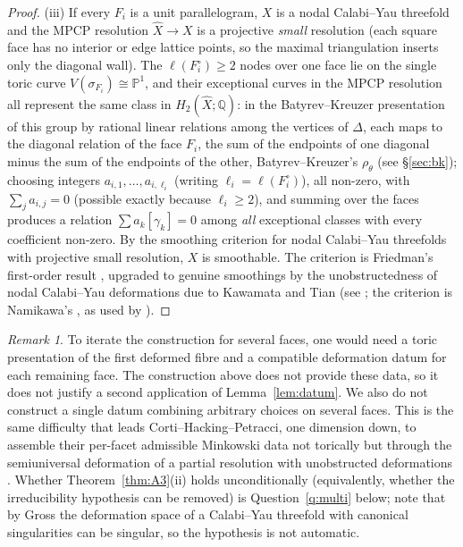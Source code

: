 \documentclass[11pt]{amsart}
\theoremstyle{definition}
\theoremstyle{remark}
\newtheorem{remark}[theorem]{Remark}
\newcommand{\PP}{\mathbb{P}}
\begin{document}
\begin{proof}
(iii)  If every $F_i$ is a unit parallelogram, $X$ is a nodal
Calabi--Yau threefold and the MPCP resolution $\widehat X \to X$ is a
projective \emph{small} resolution (each square face has no interior or
edge lattice points, so the maximal triangulation inserts only the
diagonal wall).  The $\ell(F_i^\circ) \ge 2$ nodes over one face lie on
the single toric curve $V(\sigma_{F_i}) \cong \PP^1$, and their
exceptional curves in the MPCP resolution all represent the same class
in $H_2(\widehat X;\mathbb{Q})$: in the Batyrev--Kreuzer presentation of
this group by rational linear relations among the vertices of $\Delta$,
each maps to the diagonal relation of the face $F_i$, the sum of the
endpoints of one diagonal minus the sum of the endpoints of the other,
Batyrev--Kreuzer's $\rho_\theta$ \cite{BK10} (see \S\ref{sec:bk}); choosing integers $a_{i,1},\dots,a_{i,\ell_i}$
(writing $\ell_i = \ell(F_i^\circ)$), all
non-zero, with $\sum_j a_{i,j} = 0$ (possible exactly because
$\ell_i \ge 2$), and summing over the faces produces a relation
$\sum a_k [\gamma_k] = 0$ among \emph{all} exceptional classes with every
coefficient non-zero.  By the smoothing criterion for nodal
Calabi--Yau threefolds with projective small resolution, $X$ is
smoothable.  The criterion is Friedman's first-order result
\cite{Friedman86}, upgraded to genuine
smoothings by the unobstructedness of nodal Calabi--Yau deformations
due to Kawamata and Tian (see \cite{RollenskeThomas}; the criterion is
Namikawa's \cite{Namikawa02}, as used by \cite{BK10}).
\end{proof}

\begin{remark}\label{rem:noiterate}
To iterate the construction for several faces, one would need a toric
presentation of the first deformed fibre and a compatible deformation
datum for each remaining face.  The construction above does not provide
these data, so it does not justify a second application of
Lemma~\ref{lem:datum}.  We also do not construct a single datum
combining arbitrary choices on several faces.  This is the same difficulty that leads
Corti--Hacking--Petracci, one dimension down, to assemble their per-facet
admissible Minkowski data not torically but through the semiuniversal
deformation of a partial resolution with unobstructed deformations
\cite{CHP24}.  Whether Theorem~\ref{thm:A3}(ii) holds unconditionally
(equivalently, whether the irreducibility hypothesis can be removed)
is Question~\ref{q:multi} below; note that by Gross \cite{Gross97}
the deformation space of a Calabi--Yau threefold with canonical
singularities can be singular, so the hypothesis is not automatic.
\end{remark}
\end{document}
